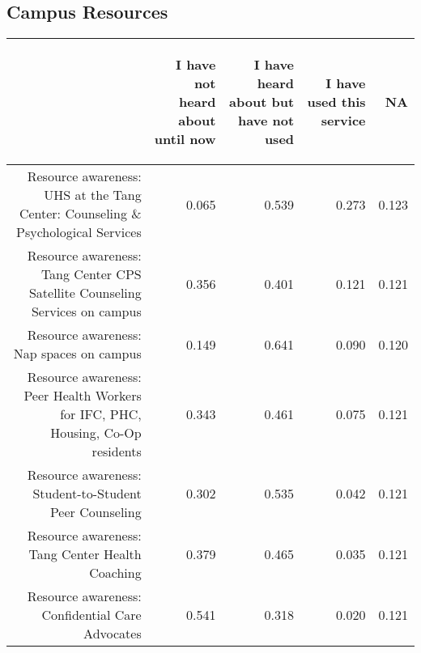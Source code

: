 \documentclass{article}\usepackage[]{graphicx}\usepackage[]{color}
\begin{document}
\subsection{Campus Resources}
\begin{table}[ht]
\centering
\begin{tabular}{rrrrr}
  \hline
 & \begin{sideways} I have not heard about until now \end{sideways} & \begin{sideways} I have heard about but have not used \end{sideways} & \begin{sideways} I have used this service \end{sideways} & \begin{sideways} NA \end{sideways} \\ 
  \hline
Resource awareness: UHS at the Tang Center: Counseling \& Psychological Services & 0.065 & 0.539 & 0.273 & 0.123 \\ 
  Resource awareness: Tang Center CPS Satellite Counseling Services on campus & 0.356 & 0.401 & 0.121 & 0.121 \\ 
  Resource awareness: Nap spaces on campus & 0.149 & 0.641 & 0.090 & 0.120 \\ 
  Resource awareness: Peer Health Workers for IFC, PHC, Housing, Co-Op residents & 0.343 & 0.461 & 0.075 & 0.121 \\ 
  Resource awareness: Student-to-Student Peer Counseling & 0.302 & 0.535 & 0.042 & 0.121 \\ 
  Resource awareness: Tang Center Health Coaching & 0.379 & 0.465 & 0.035 & 0.121 \\ 
  Resource awareness: Confidential Care Advocates & 0.541 & 0.318 & 0.020 & 0.121 \\ 
   \hline
\end{tabular}
\end{table}
\end{document}
